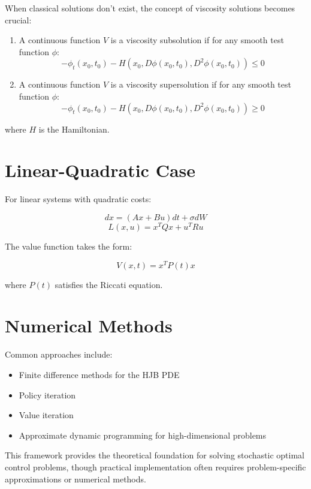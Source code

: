 \documentclass{article}
\begin{document}
When classical solutions don't exist, the concept of viscosity solutions becomes crucial:

\begin{enumerate}
\item A continuous function $V$ is a viscosity subsolution if for any smooth test function $\phi$:
\[ -\phi_t(x_0,t_0) - H(x_0,D\phi(x_0,t_0),D^2\phi(x_0,t_0)) \leq 0 \]

\item A continuous function $V$ is a viscosity supersolution if for any smooth test function $\phi$:
\[ -\phi_t(x_0,t_0) - H(x_0,D\phi(x_0,t_0),D^2\phi(x_0,t_0)) \geq 0 \]
\end{enumerate}

where $H$ is the Hamiltonian.

\section{Linear-Quadratic Case}

For linear systems with quadratic costs:

\[ dx = (Ax + Bu)dt + \sigma dW \]
\[ L(x,u) = x^TQx + u^TRu \]

The value function takes the form:

\[ V(x,t) = x^TP(t)x \]

where $P(t)$ satisfies the Riccati equation.

\section{Numerical Methods}

Common approaches include:
\begin{itemize}
\item Finite difference methods for the HJB PDE
\item Policy iteration
\item Value iteration
\item Approximate dynamic programming for high-dimensional problems
\end{itemize}

This framework provides the theoretical foundation for solving stochastic optimal control problems, though practical implementation often requires problem-specific approximations or numerical methods.
\end{document}
